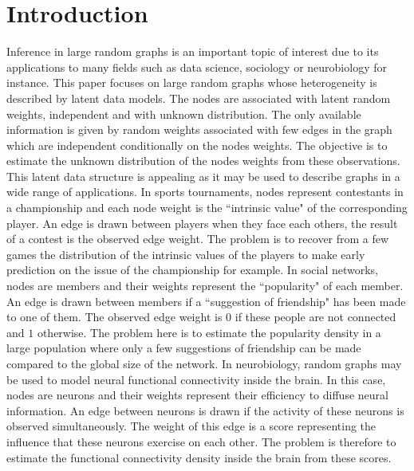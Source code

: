 \section{Introduction}
Inference in large random graphs is an important topic of interest due to its applications to many fields such as data science, sociology or neurobiology for instance. This paper focuses on large random graphs whose heterogeneity is described by latent data models. The nodes are associated with latent random weights, independent and with unknown distribution. The only available information is given by random weights associated with few edges in the graph which are independent conditionally on the nodes weights. The objective is to estimate the unknown distribution of the nodes weights from these observations.  This latent data structure is appealing as it may be used to describe graphs in a wide range of applications. In sports tournaments, nodes represent contestants in a championship and each node weight is the ``intrinsic value" of the corresponding player. An edge is drawn between players when they face each others, the result of a contest is the observed edge weight. The problem is to recover from a few games the distribution of the intrinsic values of the players to make early prediction on the issue of the championship  for example.
In social networks, nodes are members and their weights represent the ``popularity" of each member. An edge is drawn between members if a ``suggestion of friendship" has been made to one of them. The observed edge weight is $0$ if these people are not connected and $1$ otherwise. The problem here is to estimate the popularity density in a large population where only a few suggestions of friendship can be made compared to the global size of the network.
In neurobiology, random graphs may be used to model neural functional connectivity inside the brain. In this case, nodes are neurons and their weights represent their efficiency to diffuse neural information. An edge between neurons is drawn if the activity of these neurons is observed simultaneously. The weight of this edge is a score representing the influence that these neurons exercise on each other. The problem is therefore to estimate the functional connectivity density inside the brain from these scores.


